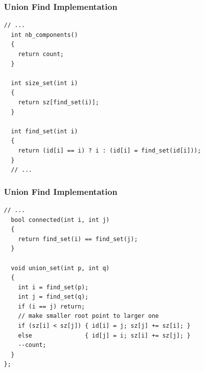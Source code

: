 \documentclass{beamer}
\newcommand{\uvalink}[2]{UVa Online Judge (http://uva.onlinejudge.org)
  problem number \href{#2}{\textcolor{blue}{#1}.}}
\newcommand{\spojlink}[2]{Sphere Online Judge (http://www.spoj.com)
  problem: \href{#2}{\textcolor{blue}{#1}.}}
\newcommand{\hint}[1]{
\begin{bclogo}[arrondi=0.1, logo=\bclampe]{Hint}
#1
\end{bclogo}
}
\newcounter{exo}
\newcommand{\exo}{
  \addtocounter{exo}{1}
  Exercice \arabic{exo}
}
\begin{document}
\begin{frame}[containsverbatim]
\frametitle{Union Find Implementation}

\scriptsize

\begin{lstlisting}[mathescape]
  // ...
  int nb_components()
  {
    return count;
  }

  int size_set(int i)
  {
    return sz[find_set(i)];
  }

  int find_set(int i)
  {
    return (id[i] == i) ? i : (id[i] = find_set(id[i]));
  }
  // ...
\end{lstlisting}

\end{frame}

\begin{frame}[containsverbatim]
\frametitle{Union Find Implementation}

\scriptsize

\begin{lstlisting}[mathescape]
  // ...
  bool connected(int i, int j)
  {
    return find_set(i) == find_set(j);
  }

  void union_set(int p, int q)
  {
    int i = find_set(p);
    int j = find_set(q);
    if (i == j) return;
    // make smaller root point to larger one
    if (sz[i] < sz[j]) { id[i] = j; sz[j] += sz[i]; }
    else               { id[j] = i; sz[i] += sz[j]; }
    --count;
  }
};
\end{lstlisting}

\end{frame}

\end{document}
